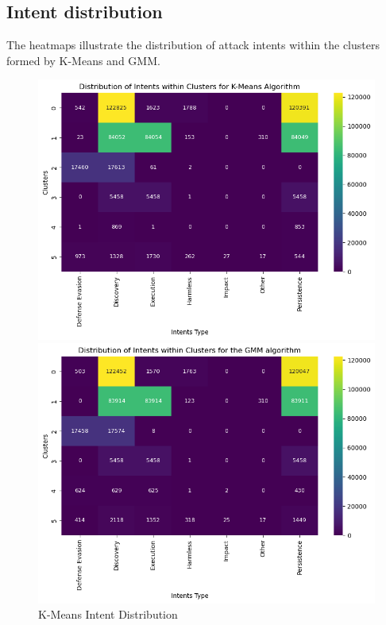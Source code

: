     \subsection{Intent distribution} %
    
        The heatmaps illustrate the distribution of attack intents within the clusters formed by K-Means and GMM.
        
        \begin{figure}[h]
            \centering
            \begin{minipage}[c]{0.47\textwidth}
                \centering
                \includegraphics[width=\textwidth]{../figures/plots/section3/Intent_Distribution_kmeans.png}
                \caption{K-Means Intent Distribution}
                \label{fig:}
            \end{minipage}
            \hfill
            \begin{minipage}[c]{0.47\textwidth}
                \centering
                \includegraphics[width=\textwidth]{../figures/plots/section3/Intent_Distribution_gmm.png}

\end{minipage}
\end{figure}
